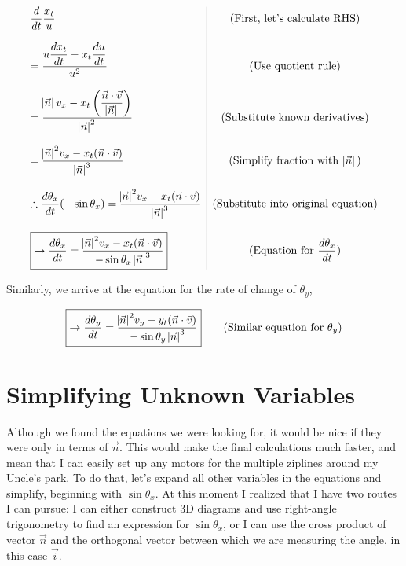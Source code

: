 \documentclass[12pt]{article}
\begin{document}
$$
\begin{array}{l|c}
  \dfrac{d}{dt}\dfrac{x_t}{u} & \text{(First, let's calculate RHS)} \\ \\
  =\dfrac{u\dfrac{dx_t}{dt} - x_t\dfrac{du}{dt}}{u^2} & \text{(Use quotient rule)} \\ \\
  =\dfrac{\abs{\vec n} v_x - x_t\left(\dfrac{\vec n \cdot \vec v}{\abs{\vec n}}\right)}{{\abs{\vec n}}^2} & \text{(Substitute known derivatives)} \\ \\
  =\dfrac{{\abs{\vec n}}^2 v_x -x_t (\vec n \cdot \vec v)}{{\abs{\vec n}}^3} & \text{(Simplify fraction with } \abs{\vec n} \text{)} \\ \\
  \therefore \dfrac{d\theta_x}{dt}(-\sin  \theta_x) = \dfrac{{\abs{\vec n}}^2 v_x - x_t(\vec n \cdot \vec v)}{{\abs{\vec n}}^3} & \text{(Substitute into original equation)} \\ \\
  \boxed{\rightarrow \frac{d\theta_x}{dt} = \frac{{\abs{\vec n}}^2 v_x - x_t(\vec n \cdot \vec v)}{-\sin  \theta_x{\;\abs{\vec n}}^3}} & \text{(Equation for } \dfrac{d\theta_x}{dt} \text{)}   \\

\end{array} 
$$

\vspace{15pt}
Similarly, we arrive at the equation for the rate of change of $\theta_y$, 

$$\boxed{\rightarrow \frac{d\theta_y}{dt} = \frac{{\abs{\vec n}}^2 v_y - y_t(\vec n \cdot \vec v)}{-\sin  \theta_y{\;\abs{\vec n}}^3}} \quad \quad \text{(Similar equation for } \theta_y \text{)}$$


\section{Simplifying Unknown Variables}

Although we found the equations we were looking for, it would be nice if they were only in terms of $\vec n$. This would make the final calculations much faster, and mean that I can easily set up any motors for the multiple ziplines around my Uncle's park. To do that, let's expand all other variables in the equations and simplify, beginning with $\sin \theta_x$. At this moment I realized that I have two routes I can pursue: I can either construct 3D diagrams and use right-angle trigonometry to find an expression for $\sin \theta_x$, or I can use the cross product of vector $\vec n$ and the orthogonal vector between which we are measuring the angle, in this case $\vec i$.
\end{document}
